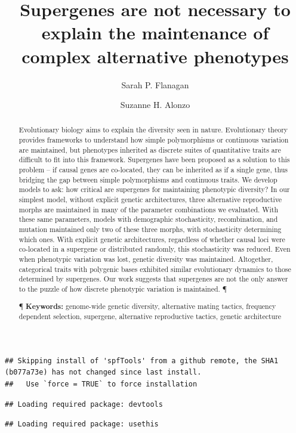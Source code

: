 \documentclass[
  11pt,
  a4paper,
]{article}
\author[1,*]{Sarah P. Flanagan}
\author[2]{Suzanne H. Alonzo}
\affil[1]{\footnotesize School of Biological Sciences, University of Canterbury}
\affil[2]{\footnotesize Department of Ecology and Evolutionary Biology, University of California Santa Cruz}
\affil[*]{Corresponding author: spflanagan.phd@gmail.com}
\title{Supergenes are not necessary to explain the maintenance of complex alternative phenotypes}
\date{\vspace{-2.5em}}
\begin{document}
\maketitle
\begin{abstract}
Evolutionary biology aims to explain the diversity seen in nature. Evolutionary theory provides frameworks to understand how simple polymorphisms or continuous variation are maintained, but phenotypes inherited as discrete suites of quantitative traits are difficult to fit into this framework. Supergenes have been proposed as a solution to this problem -- if causal genes are co-located, they can be inherited as if a single gene, thus bridging the gap between simple polymorphisms and continuous traits. We develop models to ask: how critical are supergenes for maintaining phenotypic diversity? In our simplest model, without explicit genetic architectures, three alternative reproductive morphs are maintained in many of the parameter combinations we evaluated. With these same parameters, models with demographic stochasticity, recombination, and mutation maintained only two of these three morphs, with stochasticity determining which ones. With explicit genetic architectures, regardless of whether causal loci were co-located in a supergene or distributed randomly, this stochasticity was reduced. Even when phenotypic variation was lost, genetic diversity was maintained. Altogether, categorical traits with polygenic bases exhibited similar evolutionary dynamics to those determined by supergenes. Our work suggests that supergenes are not the only answer to the puzzle of how discrete phenotypic variation is maintained. ¶ \par ¶ \textbf{Keywords:} genome-wide genetic diversity, alternative mating tactics, frequency dependent selection, supergene, alternative reproductive tactics, genetic architecture
\end{abstract}

\begin{verbatim}
## Skipping install of 'spfTools' from a github remote, the SHA1 (b077a73e) has not changed since last install.
##   Use `force = TRUE` to force installation
\end{verbatim}

\begin{verbatim}
## Loading required package: devtools
\end{verbatim}

\begin{verbatim}
## Loading required package: usethis
\end{verbatim}
\end{document}
